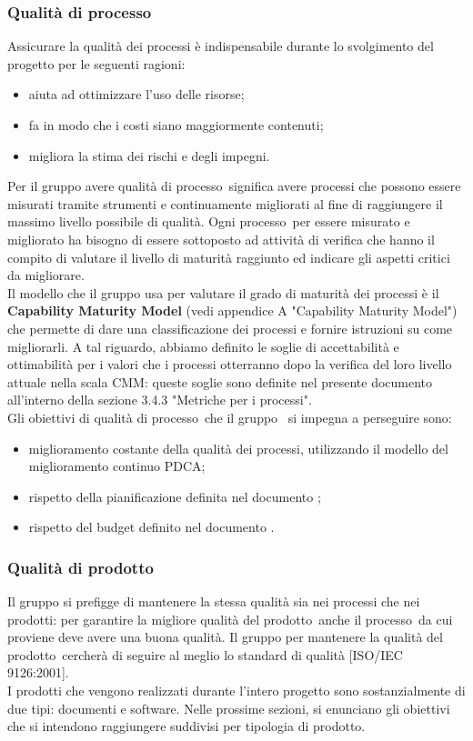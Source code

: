 \documentclass[../PianoDiQualifica.tex]{subfiles}
\begin{document}
		\subsubsection{Qualità di processo}
		Assicurare la qualità dei processi è indispensabile durante lo svolgimento del progetto per le seguenti ragioni:
		\begin{itemize}
		\item aiuta ad ottimizzare l'uso delle risorse;
		\item fa in modo che i costi siano maggiormente contenuti;
		\item migliora la stima dei rischi e degli impegni.
		\end{itemize}
		Per il gruppo avere qualità di processo\g\ significa avere processi che possono essere misurati tramite strumenti e continuamente migliorati al fine di raggiungere il massimo livello possibile di qualità. Ogni processo\g\ 
per essere misurato e migliorato ha bisogno di essere sottoposto ad attività di verifica che hanno il compito di valutare il livello di maturità raggiunto ed indicare gli aspetti critici da migliorare.\\
		Il modello che il gruppo usa per valutare il grado di maturità dei processi è il \textbf{Capability Maturity Model} (vedi appendice A "Capability Maturity Model") che permette di dare una classificazione dei processi e fornire istruzioni su come migliorarli. A tal riguardo, abbiamo definito le soglie di accettabilità e ottimabilità per i valori che i processi otterranno dopo la verifica del loro livello attuale nella scala CMM\g: queste soglie sono definite nel presente documento all'interno della sezione 3.4.3 "Metriche per i processi".\\
		Gli obiettivi di qualità di processo\g\ che il gruppo \leaf\ si impegna a perseguire sono:
		\begin{itemize}
			\item miglioramento costante della qualità dei processi, utilizzando il modello del miglioramento continuo PDCA\g;
			\item rispetto della pianificazione definita nel documento \pianodiprogettov;
			\item rispetto del budget definito nel documento \pianodiprogettov.
		\end{itemize}
		\subsubsection{Qualità di prodotto}
		Il gruppo si prefigge di mantenere la stessa qualità sia nei processi che nei prodotti: per garantire la migliore qualità del prodotto\g\ anche il processo\g\ da cui proviene deve avere una buona qualità. Il gruppo per mantenere la qualità del prodotto\g\ 
cercherà di seguire al meglio lo standard di qualità [ISO/IEC 9126:2001].\\
		I prodotti che vengono realizzati durante l'intero progetto sono sostanzialmente di due tipi: documenti e software\g. Nelle prossime sezioni, si enunciano gli obiettivi che si intendono raggiungere suddivisi per tipologia di prodotto\g.
\end{document}
